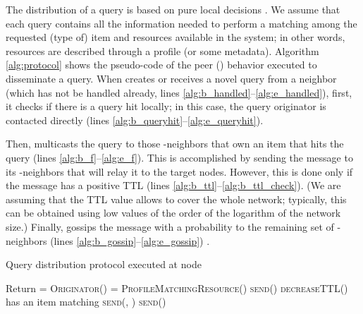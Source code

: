 \documentclass{sig-alternate}
\begin{document}
The distribution of a query is based on pure local decisions \cite{disio11}. 
We assume that each query contains all the information needed to perform a matching among the requested (type of) item and resources available in the system; in other words, resources are described through a profile (or some metadata).
Algorithm \ref{alg:protocol} shows the pseudo-code of the peer () behavior executed to disseminate a query. When  creates or receives a novel query from a neighbor  (which has not be handled already, lines \ref{alg:b_handled}--\ref{alg:e_handled}), first, it checks if there is a query hit locally; in this case, the query originator is contacted directly (lines \ref{alg:b_queryhit}--\ref{alg:e_queryhit}). 

Then,  multicasts the query to those -neighbors that own an item that hits the query (lines \ref{alg:b_f}--\ref{alg:e_f}). This is accomplished by sending the message to its -neighbors that will relay it to the target nodes. However, this is done only if the message has a positive \ac{TTL} (lines \ref{alg:b_ttl}--\ref{alg:b_ttl_check}). (We are assuming that the TTL value allows to cover the whole network; typically, this can be obtained using low values of the order of the logarithm of the network size.)
Finally,  gossips the message with a probability   to the remaining set of -neighbors (lines \ref{alg:b_gossip}--\ref{alg:e_gossip}) \cite{disio11}.

\begin{algorithm}[t]
\caption{Query distribution protocol executed at node }
\label{alg:protocol}
\begin{small}
\begin{algorithmic}[1]
 \label{alg:b_handled} 
  \STATE Return
\ENDIF \label{alg:e_handled}
 \label{alg:b_queryhit}\hfill{} 
  \STATE  = \textsc{Originator()}
  \STATE  = \textsc{ProfileMatchingResource()}
  \STATE 
  \STATE \textsc{send}()\ENDIF \label{alg:e_queryhit}
\STATE \textsc{decreaseTTL}() \label{alg:b_ttl} 
 \label{alg:b_ttl_check}\hfill{}
\STATE   has an item matching  \label{alg:b_f}
 \FORALL{}
   \STATE \textsc{send}(, )\ENDFOR \label{alg:e_f}
 \FORALL{ } \hfill{}\label{alg:b_gossip}
       \STATE \textsc{send}()\ENDIF \ENDFOR \label{alg:e_gossip}
\ENDIF \label{alg:e_ttl}
\end{algorithmic}
\end{small}
\end{algorithm}
\end{document}
